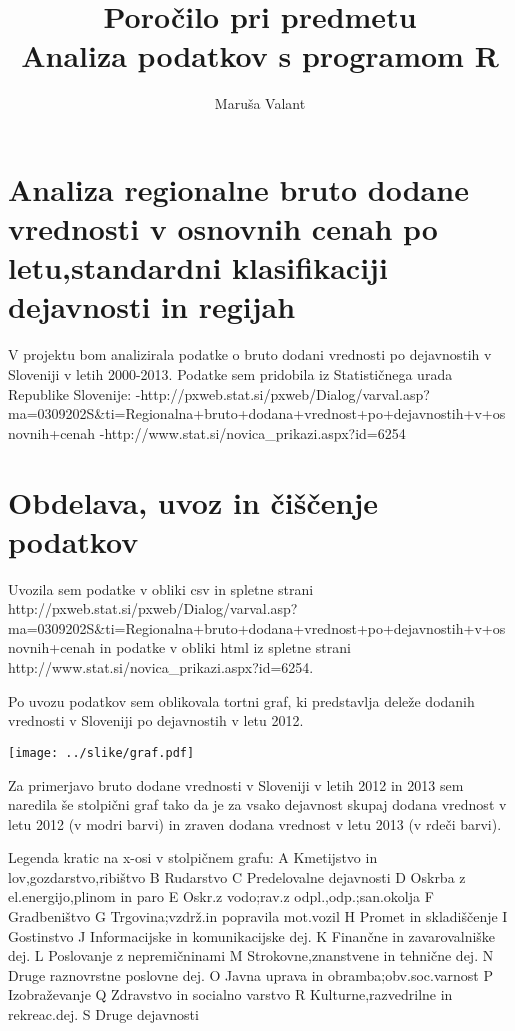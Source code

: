 \documentclass[11pt,a4paper]{article}
\begin{document}
\title{Poročilo pri predmetu \\
Analiza podatkov s programom R}
\author{Maruša Valant}
\maketitle

\section{Analiza regionalne bruto dodane vrednosti v osnovnih cenah po letu,standardni klasifikaciji dejavnosti in regijah} 

V projektu bom analizirala podatke o bruto dodani vrednosti po dejavnostih v Sloveniji v letih 2000-2013. Podatke sem pridobila iz Statističnega urada Republike Slovenije:
-http://pxweb.stat.si/pxweb/Dialog/varval.asp?ma=0309202S&ti=Regionalna+bruto+dodana+vrednost+po+dejavnostih+v+osnovnih+cenah%
-http://www.stat.si/novica_prikazi.aspx?id=6254

\section{Obdelava, uvoz in čiščenje podatkov}

Uvozila sem podatke v obliki csv in spletne strani http://pxweb.stat.si/pxweb/Dialog/varval.asp?ma=0309202S&ti=Regionalna+bruto+dodana+vrednost+po+dejavnostih+v+osnovnih+cenah%
in podatke v obliki html iz spletne strani http://www.stat.si/novica_prikazi.aspx?id=6254.

Po uvozu podatkov sem oblikovala tortni graf, ki predstavlja deleže dodanih vrednosti v Sloveniji po dejavnostih v letu 2012.

\texttt{[image: ../slike/graf.pdf]}

Za primerjavo bruto dodane vrednosti v Sloveniji v letih 2012 in 2013 sem naredila še stolpični graf tako da je za vsako dejavnost skupaj dodana vrednost v letu 2012 (v  modri barvi) in zraven dodana vrednost v letu 2013 (v rdeči barvi). 

Legenda kratic na x-osi v stolpičnem grafu:
A Kmetijstvo in lov,gozdarstvo,ribištvo  
B Rudarstvo	
C Predelovalne dejavnosti	
D Oskrba z el.energijo,plinom in paro	
E Oskr.z vodo;rav.z odpl.,odp.;san.okolja	
F  Gradbeništvo	
G Trgovina;vzdrž.in popravila mot.vozil	
H  Promet in skladiščenje	
I  Gostinstvo	
J Informacijske in komunikacijske dej.	
K Finančne in zavarovalniške dej.	
L Poslovanje z nepremičninami	
M Strokovne,znanstvene in tehnične dej.	
N Druge raznovrstne poslovne dej.	
O Javna uprava in obramba;obv.soc.varnost	
P  Izobraževanje	
Q  Zdravstvo in socialno varstvo	
R Kulturne,razvedrilne in rekreac.dej.	
S  Druge dejavnosti
\end{document}

